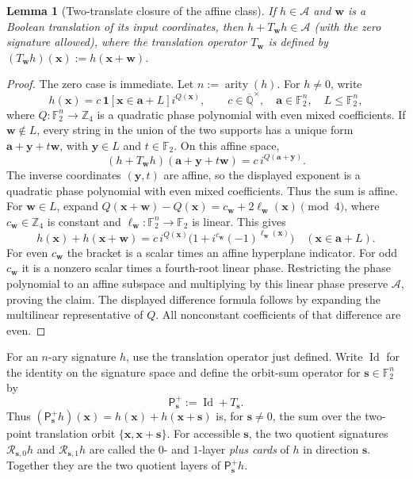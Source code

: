 \documentclass[11pt,letterpaper,onecolumn]{article}
\theoremstyle{plain}
\newtheorem{lemma}[lemma]{Lemma}
\theoremstyle{definition}
\theoremstyle{remark}
\newcommand{\AlgNums}{\overline{\mathbb Q}}
\newcommand{\Ftwo}{\mathbb F_2}
\newcommand{\cA}{\mathscr A}
\newcommand{\arity}{\operatorname{arity}}
\newcommand{\one}{\mathbf 1}
\begin{document}
\begin{lemma}[Two-translate closure of the affine class]
\label{lem:affine-two-translate-closure}
If \(h\in\cA\) and \({\mathbf{w}}\) is a Boolean translation of its input
coordinates, then \(h+T_{\mathbf{w}}h\in\cA\) (with the zero signature allowed), where
the translation operator \(T_{\mathbf{w}}\) is defined by \((T_{\mathbf{w}}h)({\mathbf{x}}):=h({\mathbf{x}}+{\mathbf{w}})\).
\end{lemma}

\begin{proof}
The zero case is immediate.  Let \(n:=\arity(h)\).  For \(h\ne0\), write
\[
 h({\mathbf{x}})=c\,\one[{\mathbf{x}}\in {\mathbf{a}}+L]i^{Q({\mathbf{x}})},
 \qquad c\in\AlgNums^\times,\quad {\mathbf{a}}\in\Ftwo^n,\quad
 L\le\Ftwo^n,
\]
where \(Q:\Ftwo^n\to\mathbb Z_4\) is a quadratic phase polynomial with even mixed
coefficients.  If \({\mathbf{w}}\notin L\), every string in the union of the two supports
has a unique form \({\mathbf{a}}+{\mathbf{y}}+t{\mathbf{w}}\), with \({\mathbf{y}}\in L\) and \(t\in\Ftwo\).  On this
affine space,
\[
 (h+T_{\mathbf{w}}h)({\mathbf{a}}+{\mathbf{y}}+t{\mathbf{w}})=c\,i^{Q({\mathbf{a}}+{\mathbf{y}})}.
\]
The inverse coordinates \(({\mathbf{y}},t)\) are affine, so the displayed exponent
is a quadratic phase polynomial with even mixed coefficients.  Thus the sum is affine.
For \({\mathbf{w}}\in L\), expand
\(Q({\mathbf{x}}+{\mathbf{w}})-Q({\mathbf{x}})=c_{\mathbf{w}}+2\ell_{\mathbf{w}}({\mathbf{x}})\pmod4\), where
\(c_{\mathbf{w}}\in\mathbb Z_4\) is constant and
\(\ell_{\mathbf{w}}:\Ftwo^n\to\Ftwo\) is linear.  This gives
\[
 h({\mathbf{x}})+h({\mathbf{x}}+{\mathbf{w}})=c\,i^{Q({\mathbf{x}})}\bigl(1+i^{c_{\mathbf{w}}}(-1)^{\ell_{\mathbf{w}}({\mathbf{x}})}\bigr)
 \quad({\mathbf{x}}\in {\mathbf{a}}+L).
\]
For even \(c_{\mathbf{w}}\) the bracket is a scalar times an affine hyperplane
indicator. For odd \(c_{\mathbf{w}}\) it is a nonzero scalar times a fourth-root
linear phase.  Restricting the phase polynomial to an affine subspace and multiplying
by this linear phase preserve \(\cA\), proving the claim.  The displayed difference formula follows by
expanding the multilinear representative of \(Q\). All nonconstant
coefficients of that difference are even.
\end{proof}

For an \(n\)-ary signature \(h\), use the translation operator just defined.
Write \(\operatorname{Id}\) for the identity on the signature space and define
the orbit-sum operator for \({\mathbf{s}}\in\Ftwo^n\) by
\[
 \mathsf P_{\mathbf{s}}^+:=\operatorname{Id}+T_{\mathbf{s}}.
\]
Thus
\((\mathsf P_{\mathbf{s}}^+h)({\mathbf{x}})=h({\mathbf{x}})+h({\mathbf{x}}+{\mathbf{s}})\) is, for \({\mathbf{s}}\ne0\), the sum over the two-point
translation orbit \(\{{\mathbf{x}},{\mathbf{x}}+{\mathbf{s}}\}\).
For accessible \({\mathbf{s}}\), the two quotient signatures
\(\mathcal R_{{\mathbf{s}},0}h\) and \(\mathcal R_{{\mathbf{s}},1}h\) are called the
\(0\)- and \(1\)-layer \emph{plus cards} of \(h\) in direction \({\mathbf{s}}\).
Together they are the two quotient layers of \(\mathsf P_{\mathbf{s}}^+h\).
\end{document}

